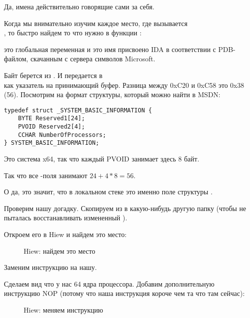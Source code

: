Да, имена действительно говорящие сами за себя.

Когда мы внимательно изучим каждое место, где вызывается\\
,
то быстро найдем то что нужно в функции :%



 это глобальная переменная и это имя присвоено IDA в соответствии с \gls{PDB}-файлом,
скачанным с сервера символов Microsoft.

Байт берется из . 
И  передается в\\
как указатель на принимающий буфер.
Разница между 0xC20 и 0xC58 это 0x38 (56).
Посмотрим на формат структуры, который можно найти в MSDN:

\begin{lstlisting}
typedef struct _SYSTEM_BASIC_INFORMATION {
    BYTE Reserved1[24];
    PVOID Reserved2[4];
    CCHAR NumberOfProcessors;
} SYSTEM_BASIC_INFORMATION;
\end{lstlisting}

Это система x64, так что каждый PVOID занимает здесь 8 байт.

Так что все -поля занимают $24+4*8=56$.

О да, это значит, что  в локальном стеке это именно поле
 структуры .

Проверим нашу догадку.
Скопируем  из  
в какую-нибудь другую папку 
(чтобы  не пыталась восстанавливать измененный ).

Откроем его в Hiew и найдем это место:

\begin{figure}[H]
\centering
{}
\caption{Hiew: найдем это место}
\end{figure}

Заменим инструкцию  на нашу.

Сделаем вид что у нас 64 ядра процессора.
Добавим дополнительную инструкцию \ac{NOP} (потому что наша инструкция короче чем та что там сейчас):

\begin{figure}[H]
\centering
{}
\caption{Hiew: меняем инструкцию}
\end{figure}

